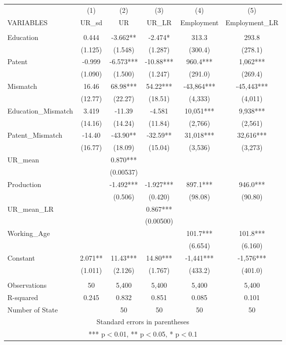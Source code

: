 \documentclass[]{article}
\begin{document}
\begin{tabular}{lccccc} \hline
 & (1) & (2) & (3) & (4) & (5) \\
VARIABLES & UR\_sd & UR & UR\_LR & Employment & Employment\_LR \\ \hline
 &  &  &  &  &  \\
Education & 0.444 & -3.662** & -2.474* & 313.3 & 293.8 \\
 & (1.125) & (1.548) & (1.287) & (300.4) & (278.1) \\
Patent & -0.999 & -6.573*** & -10.88*** & 960.4*** & 1,062*** \\
 & (1.090) & (1.500) & (1.247) & (291.0) & (269.4) \\
Mismatch & 16.46 & 68.98*** & 54.22*** & -43,864*** & -45,443*** \\
 & (12.77) & (22.27) & (18.51) & (4,333) & (4,011) \\
Education\_Mismatch & 3.419 & -11.39 & -4.581 & 10,051*** & 9,938*** \\
 & (14.16) & (14.24) & (11.84) & (2,766) & (2,561) \\
Patent\_Mismatch & -14.40 & -43.90** & -32.59** & 31,018*** & 32,616*** \\
 & (16.77) & (18.09) & (15.04) & (3,536) & (3,273) \\
UR\_mean &  & 0.870*** &  &  &  \\
 &  & (0.00537) &  &  &  \\
Production &  & -1.492*** & -1.927*** & 897.1*** & 946.0*** \\
 &  & (0.506) & (0.420) & (98.08) & (90.80) \\
UR\_mean\_LR &  &  & 0.867*** &  &  \\
 &  &  & (0.00500) &  &  \\
Working\_Age &  &  &  & 101.7*** & 101.8*** \\
 &  &  &  & (6.654) & (6.160) \\
Constant & 2.071** & 11.43*** & 14.80*** & -1,441*** & -1,576*** \\
 & (1.011) & (2.126) & (1.767) & (433.2) & (401.0) \\
 &  &  &  &  &  \\
Observations & 50 & 5,400 & 5,400 & 5,400 & 5,400 \\
R-squared & 0.245 & 0.832 & 0.851 & 0.085 & 0.101 \\
 Number of State &  & 50 & 50 & 50 & 50 \\ \hline
\multicolumn{6}{c}{ Standard errors in parentheses} \\
\multicolumn{6}{c}{ *** p$<$0.01, ** p$<$0.05, * p$<$0.1} \\
\end{tabular}
\end{document}
